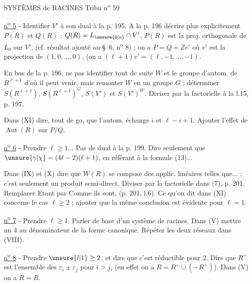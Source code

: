 SYSTÈMES de RACINES \hfill Tribu n\textsuperscript{o} 59

\uline{n\textsuperscript{o} 5} - Identifier $V'$ à son dual à la p. 195. A la p. 196 décrire plus explicitement $P(R)$ et $Q(R)$ : $Q(R)=L_{\unsure{0|o}}\cap V'$, $P(R)$ est la proj. orthogonale de $L_0$ sur $V'$, (cf. résultat ajouté au \S~6, n\textsuperscript{o} 8) ; on a $P=Q+Zv'$ où $v'$ est la projection de $(1,0,\ldots,0)$, (on a $(\ell+1)v'=(\ell,-1,\ldots,-1)$.

En bas de la p. 196, ne pas identifier tout de suite $W$ et le groupe d'autom. de $R^{\ell+1}$ d'où il peut venir, mais remonter $W$ en un groupe $G$ ; déterminer $S(R^{\ell+1})$, $S(R^{\ell+1})^G$, $S(V')$ et $S(V')^W$. Diviser par la factorielle à la l.15, p. 197.

Dans (XI) dire, tout de go, que l'autom. échange $i$ et $\ell-i+1$. Ajouter l'effet de $\operatorname{Aut}(R)$ sur $P/Q$.

\uline{n\textsuperscript{o} 6} - Prendre $\ell\geq 1$... Pas de dual à la p. 199. Dire seulement que $\unsure{\gamma|\chi}=(4\ell-2)(\ell+1)$, en référant à la formule (13)...

Dans (IX) et (X) dire que $W(R)$ se compose des applic. linéaires telles que... ; c'est seulement un produit semi-direct. Diviser par la factorielle dans (7), p. 201. Remplacer \textquotedbl{}Etant\textquotedbl{} par \textquotedbl{}Comme ils sont\textquotedbl{}, (p. 201, l.6). Ce qu'on dit dans (XI) concerne le cas $\ell\geq 2$ ; ajouter que la même conclusion est évidente pour $\ell=1$.

\uline{n\textsuperscript{o} 7} - Prendre $\ell\geq 1$. Parler de \textquotedbl{}base\textquotedbl{} d'un système de racines. Dans (V) mettre un 4 au dénominateur de la forme canonique. Répéter les deux réseaux dans (VIII). \handwritten{\unsure{--}}

\uline{n\textsuperscript{o} 8} - Prendre $\unsure{l|1}\geq 2$, et dire que c'est réductible pour 2. Dire que $R^+$ est l'ensemble des $\varepsilon_i\pm\varepsilon_j$ pour $i>j$, (en effet on a $R=R^+\cup(-R^+)$). Dans (V) on a $R=R$.

